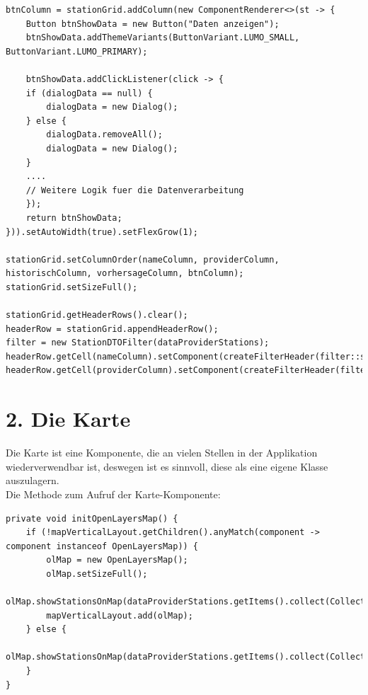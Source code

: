 \documentclass[a4paper,12pt]{scrreprt}
\begin{document}
\begin{lstlisting}
btnColumn = stationGrid.addColumn(new ComponentRenderer<>(st -> {
	Button btnShowData = new Button("Daten anzeigen");
	btnShowData.addThemeVariants(ButtonVariant.LUMO_SMALL, ButtonVariant.LUMO_PRIMARY);
		
	btnShowData.addClickListener(click -> {
	if (dialogData == null) {
		dialogData = new Dialog();
	} else {
		dialogData.removeAll();
		dialogData = new Dialog();
	}
	....
	// Weitere Logik fuer die Datenverarbeitung
	});
	return btnShowData;
})).setAutoWidth(true).setFlexGrow(1);
	
stationGrid.setColumnOrder(nameColumn, providerColumn, historischColumn, vorhersageColumn, btnColumn);
stationGrid.setSizeFull();
	
stationGrid.getHeaderRows().clear();
headerRow = stationGrid.appendHeaderRow();
filter = new StationDTOFilter(dataProviderStations);
headerRow.getCell(nameColumn).setComponent(createFilterHeader(filter::setStationName));
headerRow.getCell(providerColumn).setComponent(createFilterHeader(filter::setProvider));
\end{lstlisting}

\section*{\small \textbf{2. Die Karte}}
Die Karte ist eine Komponente, die an vielen Stellen in der Applikation wiederverwendbar ist, deswegen ist es sinnvoll, diese als eine eigene Klasse auszulagern.\\
Die Methode zum Aufruf der Karte-Komponente:
\begin{lstlisting}
private void initOpenLayersMap() {
	if (!mapVerticalLayout.getChildren().anyMatch(component -> component instanceof OpenLayersMap)) {
		olMap = new OpenLayersMap();
		olMap.setSizeFull();
		olMap.showStationsOnMap(dataProviderStations.getItems().collect(Collectors.toList()));
		mapVerticalLayout.add(olMap);
	} else {
	olMap.showStationsOnMap(dataProviderStations.getItems().collect(Collectors.toList()));
	}
}
\end{lstlisting}
\end{document}
